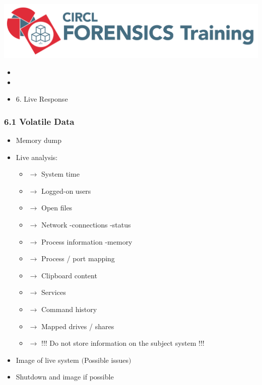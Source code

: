%
%



\begin{frame}
    \includegraphics[scale=.3]{images/logo-circl-Forensics.png}
    \begin{itemize}
        \item[]
        \item[]
        \item[] 6. Live Response
    \end{itemize}
\end{frame}


\begin{frame}
  \frametitle{6.1 Volatile Data}
  \begin{itemize}
      \item Memory dump
      \item Live analysis:
      \begin{itemize}
          \item[] $\to$ System time
          \item[] $\to$ Logged-on users
          \item[] $\to$ Open files
          \item[] $\to$ Network -connections -status
          \item[] $\to$ Process information -memory
          \item[] $\to$ Process / port mapping
          \item[] $\to$ Clipboard content
          \item[] $\to$ Services
          \item[] $\to$ Command history
          \item[] $\to$ Mapped drives / shares
          \item[] $\to$ !!! Do not store information on the subject system !!!
      \end{itemize}
      \item Image of live system $($Possible issues$)$
      \item Shutdown and image if possible
  \end{itemize}
\end{frame}


